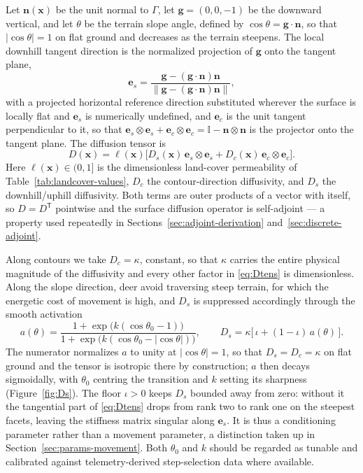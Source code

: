 \documentclass[11pt]{article}
\begin{document}
Let $\mathbf{n}(\mathbf{x})$ be the unit normal to $\Gamma$, let $\mathbf{g}=(0,0,-1)$ be the downward vertical, and let $\theta$ be the terrain slope angle, defined by $\cos\theta = \mathbf{g}\cdot\mathbf{n}$, so that $|\cos\theta| = 1$ on flat ground and decreases as the terrain steepens. The local downhill tangent direction is the normalized projection of $\mathbf{g}$ onto the tangent plane,
\begin{equation}
  \mathbf{e}_s = \frac{\mathbf{g}-(\mathbf{g}\cdot\mathbf{n})\mathbf{n}}{\big\lVert \mathbf{g}-(\mathbf{g}\cdot\mathbf{n})\mathbf{n}\big\rVert},
\end{equation}
with a projected horizontal reference direction substituted wherever the surface is locally flat and $\mathbf{e}_s$ is numerically undefined, and $\mathbf{e}_c$ is the unit tangent perpendicular to it, so that $\mathbf{e}_s\otimes\mathbf{e}_s + \mathbf{e}_c\otimes\mathbf{e}_c = \mathbb{I}-\mathbf{n}\otimes\mathbf{n}$ is the projector onto the tangent plane. The diffusion tensor is
\begin{equation}
  D(\mathbf{x}) = \ell(\mathbf{x})\Big[D_s(\mathbf{x})\,\mathbf{e}_s\otimes\mathbf{e}_s + D_c(\mathbf{x})\,\mathbf{e}_c\otimes\mathbf{e}_c\Big].
  \label{eq:Dtens}
\end{equation}
Here $\ell(\mathbf{x})\in(0,1]$ is the dimensionless land-cover permeability of Table~\ref{tab:landcover-values}, $D_c$ the contour-direction diffusivity, and $D_s$ the downhill/uphill diffusivity. Both terms are outer products of a vector with itself, so $D = D^{\mathsf T}$ pointwise and the surface diffusion operator is self-adjoint --- a property used repeatedly in Sections~\ref{sec:adjoint-derivation} and~\ref{sec:discrete-adjoint}.

Along contours we take $D_c = \kappa$, constant, so that $\kappa$ carries the entire physical magnitude of the diffusivity and every other factor in \eqref{eq:Dtens} is dimensionless. Along the slope direction, deer avoid traversing steep terrain, for which the energetic cost of movement is high, and $D_s$ is suppressed accordingly through the smooth activation
\begin{equation}
  a(\theta) = \frac{1+\exp\!\big(k(\cos\theta_0-1)\big)}{1+\exp\!\big(k(\cos\theta_0-|\cos\theta|)\big)},
  \qquad
  D_s = \kappa\big[\,\iota + (1-\iota)\,a(\theta)\,\big].
  \label{eq:Ds}
\end{equation}
The numerator normalizes $a$ to unity at $|\cos\theta|=1$, so that $D_s = D_c = \kappa$ on flat ground and the tensor is isotropic there by construction; $a$ then decays sigmoidally, with $\theta_0$ centring the transition and $k$ setting its sharpness (Figure~\ref{fig:Ds}). The floor $\iota>0$ keeps $D_s$ bounded away from zero: without it the tangential part of \eqref{eq:Dtens} drops from rank two to rank one on the steepest facets, leaving the stiffness matrix singular along $\mathbf{e}_s$. It is thus a conditioning parameter rather than a movement parameter, a distinction taken up in Section~\ref{sec:params-movement}. Both $\theta_0$ and $k$ should be regarded as tunable and calibrated against telemetry-derived step-selection data where available.
\end{document}
